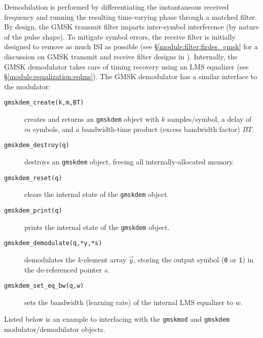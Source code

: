Demodulation is performed by differentiating the instantaneous received
frequency and running the resulting time-varying phase through a matched
filter.
By design, the GMSK transmit filter imparts inter-symbol interference
(by nature of the pulse shape).
To mitigate symbol errors, the receive filter is initially designed to
remove as much ISI as possible
(see \S\ref{module:filter:firdes_gmsk} for a discussion on GMSK transmit
and receive filter designs in \liquid).
Internally, the GMSK demodulator takes care of timing recovery using an
LMS equalizer (see \S\ref{module:equalization:eqlms}).
The GMSK demodulator has a similar interface to the modulator:
%
\begin{description}
\item[{\tt gmskdem\_create(k,m,BT)}]
    creates and returns an {\tt gmskdem} object with
    $k$ samples/symbol,
    a delay of $m$ symbols,
    and a bandwidth-time product (excess bandwidth factor) $BT$.
\item[{\tt gmskdem\_destroy(q)}]
    destroys an {\tt gmskdem} object, freeing all internally-allocated
    memory.
\item[{\tt gmskdem\_reset(q)}]
    clears the internal state of the {\tt gmskdem} object.
\item[{\tt gmskdem\_print(q)}]
    prints the internal state of the {\tt gmskdem} object.
\item[{\tt gmskdem\_demodulate(q,*y,*s)}]
    demodulates the $k$-element array $\vec{y}$, storing the output
    symbol ({\tt 0} or {\tt 1}) in the de-referenced pointer $s$.
\item[{\tt gmskdem\_set\_eq\_bw(q,w)}]
    sets the bandwidth (learning rate) of the internal LMS equalizer to
    $w$.
\end{description}


Listed below is an example to interfacing with the {\tt gmskmod} and
{\tt gmskdem} modulator/demodulator objects.
%

%
